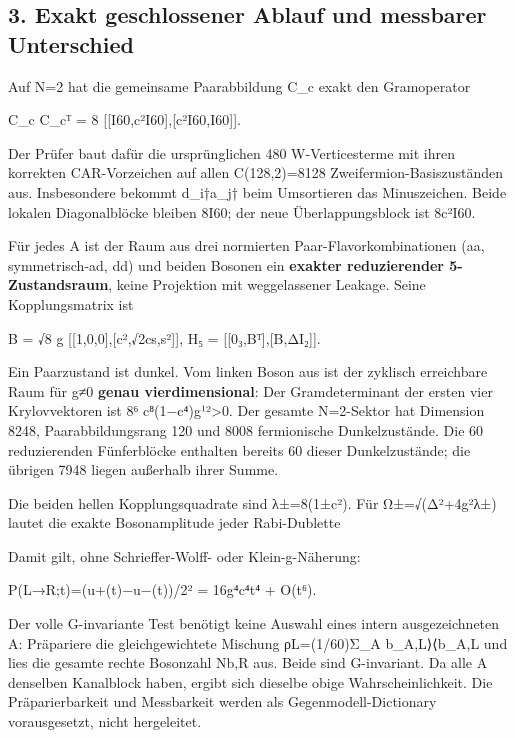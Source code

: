 \subsection{3. Exakt geschlossener Ablauf und messbarer
Unterschied}\label{exakt-geschlossener-ablauf-und-messbarer-unterschied}

Auf N=2 hat die gemeinsame Paarabbildung C\_c exakt den Gramoperator

C\_c C\_cᵀ = 8 {[}{[}I60,c²I60{]},{[}c²I60,I60{]}{]}.

Der Prüfer baut dafür die ursprünglichen 480 W-Verticesterme mit ihren
korrekten CAR-Vorzeichen auf allen C(128,2)=8128
Zweifermion-Basiszuständen aus. Insbesondere bekommt d\_i†a\_j† beim
Umsortieren das Minuszeichen. Beide lokalen Diagonalblöcke bleiben 8I60;
der neue Überlappungsblock ist 8c²I60.

Für jedes A ist der Raum aus drei normierten Paar-Flavorkombinationen
(aa, symmetrisch-ad, dd) und beiden Bosonen ein \textbf{exakter
reduzierender 5-Zustandsraum}, keine Projektion mit weggelassener
Leakage. Seine Kopplungsmatrix ist

B = √8 g {[}{[}1,0,0{]},{[}c²,√2cs,s²{]}{]}, H₅ =
{[}{[}0₃,Bᵀ{]},{[}B,ΔI₂{]}{]}.

Ein Paarzustand ist dunkel. Vom linken Boson aus ist der zyklisch
erreichbare Raum für g≠0 \textbf{genau vierdimensional}: Der
Gramdeterminant der ersten vier Krylovvektoren ist 8⁶
c⁸(1−c⁴)g¹²\textgreater0. Der gesamte N=2-Sektor hat Dimension 8248,
Paarabbildungsrang 120 und 8008 fermionische Dunkelzustände. Die 60
reduzierenden Fünferblöcke enthalten bereits 60 dieser Dunkelzustände;
die übrigen 7948 liegen außerhalb ihrer Summe.

Die beiden hellen Kopplungsquadrate sind λ±=8(1±c²). Für Ω±=√(Δ²+4g²λ±)
lautet die exakte Bosonamplitude jeder Rabi-Dublette


Damit gilt, ohne Schrieffer-Wolff- oder Klein-g-Näherung:

P(L→R;t)=\textbar(u+(t)−u−(t))/2\textbar² = 16g⁴c⁴t⁴ + O(t⁶).

Der volle G-invariante Test benötigt keine Auswahl eines intern
ausgezeichneten A: Präpariere die gleichgewichtete Mischung
ρL=(1/60)Σ\_A \textbar b\_A,L⟩⟨b\_A,L\textbar{} und lies die gesamte
rechte Bosonzahl Nb,R aus. Beide sind G-invariant. Da alle A denselben
Kanalblock haben, ergibt sich dieselbe obige Wahrscheinlichkeit. Die
Präparierbarkeit und Messbarkeit werden als Gegenmodell-Dictionary
vorausgesetzt, nicht hergeleitet.

